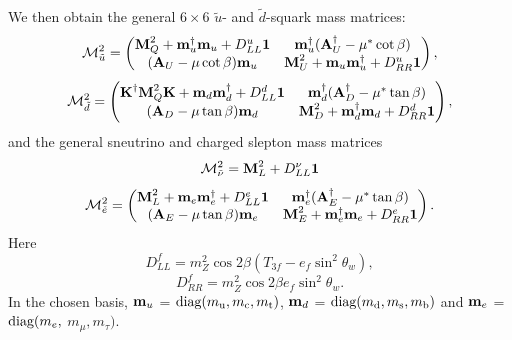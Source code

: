\documentclass[a4paper,10pt,oneside]{book}
\begin{document}
We then obtain the general $6\times6$ $\tilde{u}$- and
$\tilde{d}$-squark mass matrices:
\begin{equation}
  {\cal M}_{\tilde u}^2 = \left( 
     \begin{matrix} %
      \mbox{\bf M}_Q^2 + \mbox{\bf m}_u^\dagger \mbox{\bf m}_u +
      D_{LL}^{u} \mbox{\bf 1} &
      \mbox{\bf m}_u^\dagger 
      ( {\bf A}_U^\dagger - \mu^* \cot\beta ) \cr
      ( {\bf A}_U - \mu \cot\beta ) \mbox{\bf m}_u &
      \mbox{\bf M}_U^2 + \mbox{\bf m}_u \mbox{\bf m}_u^\dagger +
      D_{RR}^{u} \mbox{\bf 1} \cr
      \end{matrix} %
      \right),
  \label{mutilde}
\end{equation}
\begin{equation}
  {\cal M}_{\tilde d}^2=\left( {
        \begin{matrix} %
        {\mbox{\bf K}^\dagger \mbox{\bf M}_Q^2 \mbox{\bf K}+
          \mbox{\bf m}_d\mbox{\bf m}_d^\dagger+D_{LL}^{d}\mbox{\bf 1}}&
        {\mbox{\bf m}_d^\dagger ( {\bf A}_D^\dagger-\mu^*\tan\beta )}\cr
        {( {\bf A}_D-\mu\tan\beta ) \mbox{\bf m}_d}&
        {\mbox{\bf M}_D^2+\mbox{\bf m}_d^\dagger\mbox{\bf m}_d+
          D_{RR}^{d}\mbox{\bf 1}}\cr
        \end{matrix} %
        } \right),
  \label{mdtilde}
\end{equation}
and the general sneutrino and charged slepton mass matrices
\begin{equation}
  {\cal M}^2_{\tilde\nu} = \mbox{\bf M}_L^2 + D^\nu_{LL} \mbox{\bf 1}
\end{equation}
\begin{equation}
  {\cal M}^2_{\tilde e} =\left( {
       \begin{matrix} %
        {\mbox{\bf M}_L^2+\mbox{\bf m}_e\mbox{\bf m}_e^\dagger+
          D_{LL}^{e}\mbox{\bf 1}}&
        {\mbox{\bf m}_e^\dagger ( {\bf A}_E^\dagger-\mu^*\tan\beta )}\cr
        {( {\bf A}_E-\mu\tan\beta ) \mbox{\bf m}_e}&
        {\mbox{\bf M}_E^2+\mbox{\bf m}_e^\dagger\mbox{\bf m}_e+
          D_{RR}^{e}\mbox{\bf 1}}\cr
        \end{matrix} %
        } \right).
  \label{metilde}
\end{equation}
Here
\begin{equation}
  D^f_{LL}=m_Z^2\cos 2\beta(T_{3f}-e_f\sin^2\theta_w),
\end{equation}
\begin{equation}
  D^f_{RR}=m_Z^2\cos 2\beta e_f\sin^2\theta_w.
\end{equation}
In the chosen basis, $\mbox{\bf m}_u$ = $\mbox{\rm diag} ( m_{\rm
u}, m_{\rm c}, m_{\rm t} )$, $\mbox{\bf m}_d $ = $\mbox{\rm diag}
(m_{\rm d}, m_{\rm s}, m_{\rm b} )$ and $\mbox{\bf m}_e $ = $
\mbox{\rm diag} (m_e,$ $ m_\mu, m_\tau )$.
\end{document}
